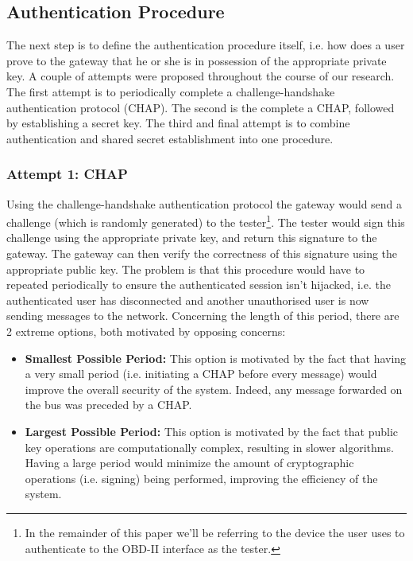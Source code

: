 \documentclass[master=cws,masteroption=vs,english]{kulemt}
\begin{document}
\subsection{Authentication Procedure}
\label{sec:authentication_procedure}

The next step is to define the authentication procedure itself, i.e. how does a user prove to the gateway that he or she is in possession of the appropriate private key. A couple of attempts were proposed throughout the course of our research. The first attempt is to periodically complete a challenge-handshake authentication protocol (CHAP). The second is the complete a CHAP, followed by establishing a secret key. The third and final attempt is to combine authentication and shared secret establishment into one procedure.

\subsubsection{Attempt 1: CHAP} Using the challenge-handshake authentication protocol the gateway would send a challenge (which is randomly generated) to the tester\footnote{In the remainder of this paper we'll be referring to the device the user uses to authenticate to the OBD-II interface as the tester.}. The tester would sign this challenge using the appropriate private key, and return this signature to the gateway. The gateway can then verify the correctness of this signature using the appropriate public key. The problem is that this procedure would have to repeated periodically to ensure the authenticated session isn't hijacked, i.e. the authenticated user has disconnected and another unauthorised user is now sending messages to the network. Concerning the length of this period, there are 2 extreme options, both motivated by opposing concerns:

\begin{itemize}
	\item \textbf{Smallest Possible Period:} This option is motivated by the fact that having a very small period (i.e. initiating a CHAP before every message) would improve the overall security of the system. Indeed, any message forwarded on the bus was preceded by a CHAP.
	
	\item \textbf{Largest Possible Period:} This option is motivated by the fact that public key operations are computationally complex, resulting in slower algorithms. Having a large period would minimize the amount of cryptographic operations (i.e. signing) being performed, improving the efficiency of the system.	
\end{itemize}
\end{document}
